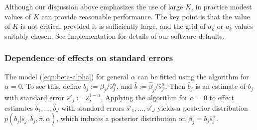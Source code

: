 \documentclass[11pt]{article}
\def\bhat{\hat{\beta}}
\def\shat{\hat{s}}
\def\qvalue{{\tt qvalue}\xspace}
\def\locfdr{{\tt locfdr}\xspace}
\def\mixfdr{{\tt mixfdr}\xspace}
\begin{document}
Although our discussion above emphasizes the use of large $K$, in practice modest values of $K$ can provide reasonable performance. 
The key point is that the value of $K$ is not critical provided it is sufficiently large, and the grid of $\sigma_k$ or $a_k$ values suitably chosen.
See Implementation for details of our software defaults.


\subsubsection*{Dependence of effects on standard errors}
 
The model (\ref{eqn:beta-alpha}) for general $\alpha$ can be fitted using the algorithm for $\alpha=0$. 
To see this, define $b_j:= \beta_j/ \shat_j^\alpha$, and $\hat{b} := \bhat_j/\shat_j^\alpha$. Then $\hat{b}_j$ is an estimate of $b_j$ with
 standard error $\shat'_j:=\shat_j^{1-\alpha}$. 
 Applying the algorithm for $\alpha=0$ to effect estimates $\hat{b}_1,\dots,\hat{b}_J$ with standard errors $\shat'_1,\dots,\shat'_J$
yields a posterior distribution $p(b_j | \shat_j, \hat{b}_j, \hat{\pi}, \alpha)$, which induces a posterior distribution on $\beta_j = b_j \shat_j^\alpha$.

\end{document}

